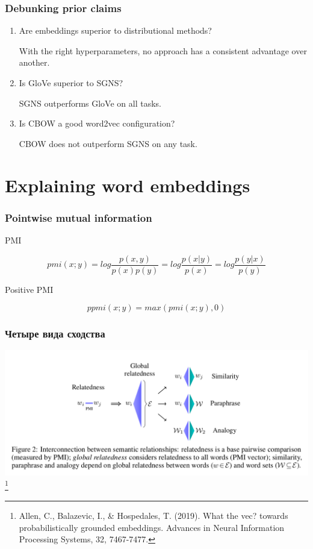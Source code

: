 \documentclass[10pt,svgnames]{beamer}
\begin{document}
\begin{frame}
  \frametitle{Debunking prior claims}
  
  \begin{enumerate}
  \item Are embeddings superior to distributional methods?

    With the right hyperparameters, no approach has a consistent
    advantage over another.
  \item Is GloVe superior to SGNS?

    SGNS outperforms GloVe on all tasks.
  \item Is CBOW a good word2vec configuration?

    CBOW does not outperform SGNS on any task.
  \end{enumerate}
\end{frame}

\section{Explaining word embeddings}

\begin{frame}
  \frametitle{Pointwise mutual information}
  PMI

  $$
  pmi(x;y) = log \frac{p(x,y)}{p(x)p(y)} = log \frac{p(x|y)}{p(x)} =
  log \frac{p(y|x)}{p(y)}
  $$

  Positive PMI

    $$
    ppmi(x;y) = max(pmi(x;y),0)
    $$    
\end{frame}

\begin{frame}
  \frametitle{Четыре вида сходства}
  \includegraphics[width=\textwidth]{sem-rels}\footnote{Allen, C.,
    Balazevic, I., \& Hospedales, T. (2019). What the vec? towards
    probabilistically grounded embeddings. Advances in Neural
    Information Processing Systems, 32, 7467-7477.}
\end{frame}
\end{document}
